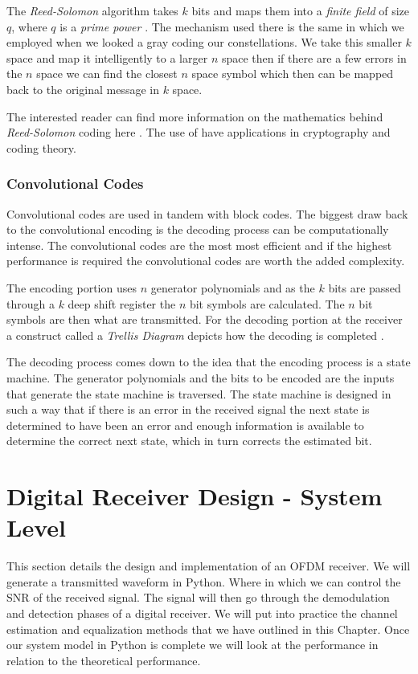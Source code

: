 The \emph{Reed-Solomon} algorithm takes $k$ bits and maps them into a \emph{finite field} of size $q$, where $q$ is a \emph{prime power} \cite{Skl01}. The mechanism used there is the same in which we employed when we looked a gray coding our constellations. We take this smaller $k$ space and map it intelligently to a larger $n$ space then if there are a few errors in the $n$ space we can find the closest $n$ space symbol which then can be mapped back to the original message in $k$ space.

The interested reader can find more information on the mathematics behind \emph{Reed-Solomon} coding here \cite{wicker1999reed}. The use of  have applications in cryptography and coding theory. 
	
	
\subsubsection{Convolutional Codes}

Convolutional codes are used in tandem with block codes. The biggest draw back to the convolutional encoding is the decoding process can be computationally intense. The convolutional codes are the most most efficient and if the highest performance is required the convolutional codes are worth the added complexity.

The encoding portion uses $n$ generator polynomials and as the $k$ bits are passed through a $k$ deep shift register the $n$ bit symbols are calculated. The $n$ bit symbols are then what are transmitted. For the decoding portion at the receiver a construct called a \emph{Trellis Diagram} depicts how the decoding is completed \cite{zehavi19928}.

The decoding process comes down to the idea that the encoding process is a state machine. The generator polynomials and the bits to be encoded are the inputs that generate the state machine is traversed. The state machine is designed in such a way that if there is an error in the received signal the next state is determined to have been an error and enough information is available to determine the correct next state, which in turn corrects the estimated bit.

\section{Digital Receiver Design - System Level}

This section details the design and implementation of an \ac{OFDM} receiver. We will generate a transmitted waveform in Python. Where in which we can control the \ac{SNR} of the received signal. The signal will then go through the demodulation and detection phases of a digital receiver. We will put into practice the channel estimation and equalization methods that we have outlined in this Chapter. Once our system model in Python is complete we will look at the performance in relation to the theoretical performance.

